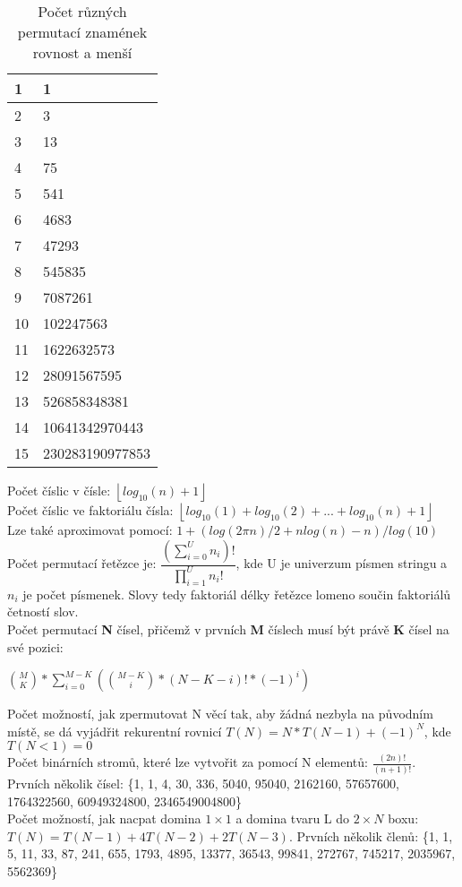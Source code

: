 \documentclass[11pt]{article}
\begin{document}
\begin{table}[H]
\centering
\caption{Počet různých permutací znamének rovnost a menší}
\begin{tabular}{|l|l|}
\hline
1&1\\ \hline
2&3\\ \hline
3&13\\ \hline
4&75\\ \hline
5&541\\ \hline
6&4683\\ \hline
7&47293\\ \hline
8&545835\\ \hline
9&7087261\\ \hline
10&102247563\\ \hline
11&1622632573\\ \hline
12&28091567595\\ \hline
13&526858348381\\ \hline
14&10641342970443\\ \hline
15&230283190977853\\ \hline
\end{tabular}
\end{table}
Počet číslic v čísle: $\left \lfloor{log_{10}(n)+1}\right \rfloor$
\\Počet číslic ve faktoriálu čísla: $\left \lfloor{log_{10}(1)+log_{10}(2)+...+log_{10}(n)+1}\right \rfloor$
\\Lze také aproximovat pomocí: $1+(log(2\pi n)/2+nlog(n)-n)/log(10)$ 
\\Počet permutací řetězce je: $\dfrac{(\sum\limits_{i=0}^U n_i)!}{\prod\limits_{i=1}^U n_i!}$, kde \textsf{U} je univerzum písmen stringu a $n_i$ je počet písmenek. Slovy tedy faktoriál délky řetězce lomeno součin faktoriálů četností slov.
\\Počet permutací \textbf{N} čísel, přičemž v prvních \textbf{M} číslech musí být právě \textbf{K} čísel na své pozici: 
\begin{center}
${M\choose K}*\sum\limits_{i=0}^{M-K}({M-K\choose i}*(N-K-i)!*(-1)^i)$
\end{center}
Počet možností, jak zpermutovat \textsf{N} věcí tak, aby žádná nezbyla na původním místě, se dá vyjádřit rekurentní rovnicí $T(N)=N*T(N-1)+(-1)^N$, kde $T(N<1)=0$
\\Počet binárních stromů, které lze vytvořit za pomocí \textsf{N} elementů: $\frac{(2n)!}{(n+1)!}$. Prvních několik čísel: \{1, 1, 4, 30, 336, 5040, 95040, 2162160, 57657600, 1764322560, 60949324800, 2346549004800\}
\\Počet možností, jak nacpat domina $1\times 1$ a domina tvaru L do $2\times N$ boxu: $T(N)=T(N-1)+4T(N-2)+2T(N-3)$. Prvních několik členů: \{1, 1, 5, 11, 33, 87, 241, 655, 1793, 4895, 13377, 36543, 99841, 272767, 745217, 2035967, 5562369\}
\end{document}
